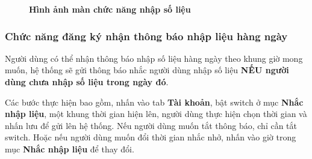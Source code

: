 \begin{figure}[H]
  \caption[Hình ảnh màn chức năng nhập số liệu]{\bfseries \fontsize{12pt}{0pt}
  \selectfont Hình ảnh màn chức năng nhập số liệu}
  \label{input_statistic_waznet}
\end{figure}

\subsubsection{Chức năng đăng ký nhận thông báo nhập liệu hàng ngày}
Người dùng có thể nhận thông báo nhập số liệu hàng ngày theo khung giờ mong muốn, hệ thống sẽ gửi thông báo nhắc người dùng nhập số liệu \textbf{NẾU người dùng chưa nhập số liệu trong ngày đó}.

Các bước thực hiện bao gồm, nhấn vào tab \textbf{Tài khoản}, bật switch ở mục \textbf{Nhắc nhập liệu}, một khung thời gian hiện lên, người dùng thực hiện chọn thời gian và nhấn lưu để gửi lên hệ thống. Nếu người dùng muốn tắt thông báo, chỉ cần tắt switch. Hoặc nếu người dùng muốn đổi thời gian nhắc nhở, nhấn vào giờ trong mục \textbf{Nhắc nhập liệu} để thay đổi.


